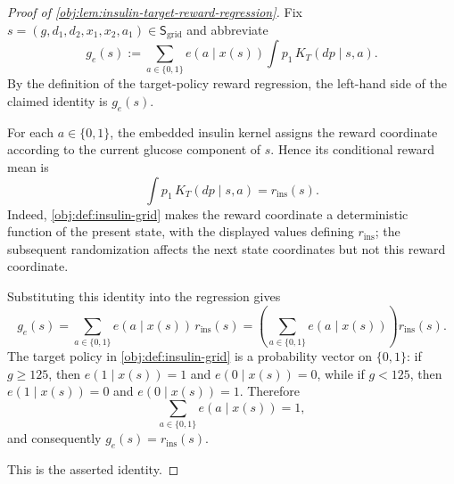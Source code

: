 \begin{proof}[Proof of \cref{obj:lem:insulin-target-reward-regression}]
Fix \(s=(g,d_1,d_2,x_1,x_2,a_1)\in\mathsf S_{\mathrm{grid}}\) and abbreviate
\[
g_e(s)
:=
\sum_{a\in\{0,1\}} e(a\mid x(s))\int p_1\,K_T(dp\mid s,a).
\]
By the definition of the target-policy reward regression, the left-hand side of the claimed identity is \(g_e(s)\). %

For each \(a\in\{0,1\}\), the embedded insulin kernel assigns the reward coordinate according to the current glucose component of \(s\). Hence its conditional reward mean is
\[
\int p_1\,K_T(dp\mid s,a)
=
r_{\mathrm{ins}}(s).
\]
Indeed, \cref{obj:def:insulin-grid} makes the reward coordinate a deterministic function of the present state, with the displayed values defining \(r_{\mathrm{ins}}\); the subsequent randomization affects the next state coordinates but not this reward coordinate. %

Substituting this identity into the regression gives
\[
g_e(s)
=
\sum_{a\in\{0,1\}} e(a\mid x(s))\,r_{\mathrm{ins}}(s)
=
\left(\sum_{a\in\{0,1\}} e(a\mid x(s))\right) r_{\mathrm{ins}}(s).
\]
The target policy in \cref{obj:def:insulin-grid} is a probability vector on \(\{0,1\}\): if \(g\ge 125\), then \(e(1\mid x(s))=1\) and \(e(0\mid x(s))=0\), while if \(g<125\), then \(e(1\mid x(s))=0\) and \(e(0\mid x(s))=1\). Therefore
\[
\sum_{a\in\{0,1\}} e(a\mid x(s))=1,
\]
and consequently \(g_e(s)=r_{\mathrm{ins}}(s)\). %

This is the asserted identity. %
\end{proof}
